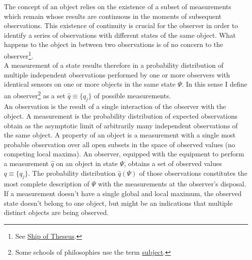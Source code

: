 The concept of an object relies on the existence of a subset of measurements which remain whose results are continuous in the moments of subsequent observations. This existence of continuity is crucial for the observer in order to identify a series of observations with different states of the same object. What happens to the object in between two observations is of no concern to the observer\footnote{See \href{https://en.wikipedia.org/wiki/Ship_of_Theseus}{Ship of Theseus}.}.\\
A measurement of a state results therefore in a probability distribution of multiple independent observations performed by one or more observers with identical sensors on one or more objects in the same state $\Psi$.
In this sense I define an observer\footnote{Some schools of philosophies use the term \href{https://en.wikipedia.org/wiki/Subject_(philosophy)}{subject}.} as a set $\hat{q}\equiv\{q_j\}$ of possible measurements.\\
An observation is the result of a single interaction of the observer with the object.
A measurement is the probability distribution of expected observations obtain as the asymptotic limit of arbitrarily many independent observations of the same object.
A property of an object is a measurement with a single most probable observation over all open subsets in the space of observed values (no competing local maxima).
An observer, equipped with the equipment to perform a measurement $\hat{q}$ on an object in state $\Psi$, obtains a set of observed values $q\equiv\{q_j\}$. The probability distribution $\hat{q}(\Psi)$ of those observations constitutes the most complete description of $\Psi$ with the measurements at the observer's disposal.
If a measurement doesn't have a single global and local maximum, the observed state doesn't belong to one object, but might be an indications that multiple distinct objects are being observed.
